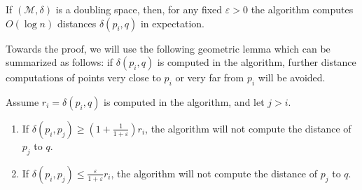 \documentclass[a4paper,UKenglish,cleveref, autoref]{lipics-v2019}
\newcommand{\eps}{\varepsilon}
\newcommand{\metricspace}{\mathcal{M}}
\newcommand{\dist}{\delta}
\begin{document}
\begin{theorem}
\label{thm:ann_bound}
    If $(\metricspace, \dist)$ is a doubling space, then, for any fixed $\eps > 0$ the
    algorithm computes $O(\log n)$ distances $\dist(p_i, q)$ in expectation.
\end{theorem}

Towards the proof, we will use the following geometric lemma which
can be summarized as follows: if $\dist(p_i,q)$ is computed in the algorithm,
further distance computations of points very close to $p_i$ or very far from $p_i$
will be avoided.

\begin{lemma}
\label{lem:bound_lemma}
Assume $r_i=\dist(p_i,q)$ is computed in the algorithm, and let $j>i$.
\begin{enumerate}
\item If $\dist(p_i,p_j)\geq (1+\frac{1}{1+\eps}) r_i$, the algorithm will not compute the distance
of $p_j$ to $q$.
\item If $\dist(p_i,p_j)\leq\frac{\eps}{1+\eps}r_i$, the algorithm will not compute
the distance of $p_j$ to $q$.
\end{enumerate}
\end{lemma}
\end{document}
